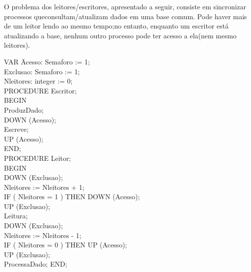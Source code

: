 O problema dos leitores/escritores, apresentado a seguir, consiste em
sincronizar processos queconsultam/atualizam dados em uma base
comum. Pode haver mais de um leitor lendo ao mesmo tempo;no entanto,
enquanto um escritor está atualizando a base, nenhum outro processo
pode ter acesso a ela(nem mesmo leitores).

\begin{tt} 
\begin{tabbing}
  VAR \=Acesso: Semaforo := 1;\\
  \>Exclusao: Semaforo := 1;\\
  \>Nleitores: integer := 0;\\

PROCEDURE Escritor;\\
BEGIN\\
\> ProduzDado;\\
\> DOWN (Acesso);\\
\> Escreve;\\
\> UP (Acesso);\\
END;\\

PROCEDURE Leitor;\\
BEGIN\\
\> DOWN (Exclusao);\\
\> Nleitores := Nleitores + 1;\\
\> IF ( Nleitores = 1 ) THEN DOWN (Acesso);\\
\> UP (Exclusao);\\
\> Leitura;\\
\> DOWN (Exclusao);\\
\> Nleitores := Nleitores - 1;\\
\> IF ( Nleitores = 0 ) THEN UP (Acesso);\\
\> UP (Exclusao);\\
\> ProcessaDado;
END;\\
 
\end{tabbing}
\end{tt}
 
